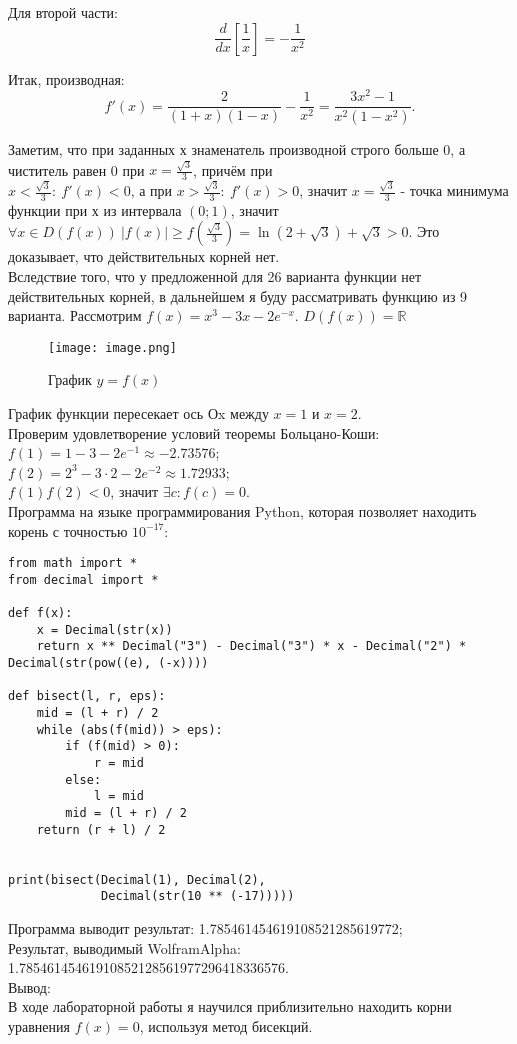 \noindent Для второй части:
\[
\frac{d}{dx}\left[\frac{1}{x}\right] = -\frac{1}{x^2}
\]

\noindent Итак, производная:
\[
f'(x) = \frac{2}{(1+x)(1-x)} - \frac{1}{x^2} = \frac{3x^2-1}{x^2(1-x^2)}.
\]

\noindent Заметим, что при заданных х знаменатель производной строго больше 0, а чиститель равен 0 при $x = \frac{\sqrt{3}}{3}$, причём при $x < \frac{\sqrt{3}}{3}: \: f'(x) < 0 \text{, а при } x > \frac{\sqrt{3}}{3}: \: f'(x) > 0$, значит $x = \frac{\sqrt{3}}{3}$ - точка минимума функции при х из интервала $(0; 1)$, значит $\forall x \in D(f(x)) \: |{f(x)|} \geq f(\frac{\sqrt{3}}{3}) = \ln{(2+\sqrt{3})} + \sqrt{3} > 0$. Это доказывает, что действительных корней нет. \\
Вследствие того, что у предложенной для 26 варианта функции нет действительных корней, в дальнейшем я буду рассматривать функцию из 9 варианта. 
\newpage
Рассмотрим $f(x) = x^3 - 3x - 2e^{-x}$. $D(f(x)) = \mathbb{R}$
\begin{figure}[H]
    \centering
    \texttt{[image: image.png]}
    \caption{График $y = f(x)$}
\end{figure}
\noindent График функции пересекает ось Оx между $x=1$ и $x=2$. \\
Проверим удовлетворение условий теоремы Больцано-Коши: \\
$f(1) = 1 - 3 - 2e^{-1} \approx -2.73576$; \\
$f(2) = 2^3 - 3\cdot2 - 2e^{-2} \approx 1.72933$; \\
$f(1)f(2)<0$, значит $\exists c: f(c) = 0$. \\
Программа на языке программирования Python, которая позволяет находить корень с точностью $10^{-17}$: 
\begin{lstlisting}
from math import *
from decimal import *

def f(x):
    x = Decimal(str(x))
    return x ** Decimal("3") - Decimal("3") * x - Decimal("2") * Decimal(str(pow((e), (-x))))

def bisect(l, r, eps):
    mid = (l + r) / 2
    while (abs(f(mid)) > eps):
        if (f(mid) > 0):
            r = mid
        else:
            l = mid
        mid = (l + r) / 2
    return (r + l) / 2


print(bisect(Decimal(1), Decimal(2),
             Decimal(str(10 ** (-17)))))
\end{lstlisting}
Программа выводит результат: 1.785461454619108521285619772; \\
Результат, выводимый WolframAlpha: 1.78546145461910852128561977296418336576. \\
Вывод: \\
В ходе лабораторной работы я научился приблизительно находить корни уравнения $f(x)=0$, используя метод бисекций.



